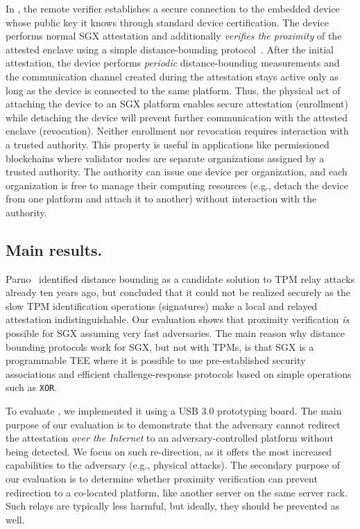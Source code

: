 In \name, the remote verifier establishes a secure connection to the embedded device whose public key it knows through standard device certification. The device performs normal SGX attestation and additionally \emph{verifies the proximity} of the attested enclave using a simple distance-bounding protocol~\cite{distanceBounding}. After the initial attestation, the device performs \emph{periodic} distance-bounding measurements and the communication channel created during the attestation stays active only as long as the device is connected to the same platform. Thus, the physical act of attaching the device to an SGX platform enables secure attestation (enrollment) while detaching the device will prevent further communication with the attested enclave (revocation). Neither enrollment nor revocation requires interaction with a trusted authority. This property is useful in applications like permissioned blockchains where validator nodes are separate organizations assigned by a trusted authority. The authority can issue one device per organization, and each organization is free to manage their computing resources (e.g., detach the device from one platform and attach it to another) without interaction with the authority. 


\subsection{Main results.} Parno~\cite{parno2008bootstrapping} identified distance bounding as a candidate solution to TPM relay attacks already ten years ago, but concluded that it could not be realized securely as the slow TPM identification operations (signatures) make a local and relayed attestation indistinguishable. Our evaluation shows that proximity verification \emph{is} possible for SGX assuming very fast adversaries. The main reason why distance bounding protocols work for SGX, but not with TPMs, is that SGX is a programmable TEE where it is possible to use pre-established security associations and efficient challenge-response protocols based on simple operations such as \texttt{XOR}.

To evaluate \name, we implemented it using a USB 3.0 prototyping board. The main purpose of our evaluation is to demonstrate that the adversary cannot redirect the attestation \emph{over the Internet} to an adversary-controlled platform without being detected. We focus on such re-direction, as it offers the most increased capabilities to the adversary (e.g., physical attacks). The secondary purpose of our evaluation is to determine whether proximity verification can prevent redirection to a co-located platform, like another server on the same server rack. Such relays are typically less harmful, but ideally, they should be prevented as well.




